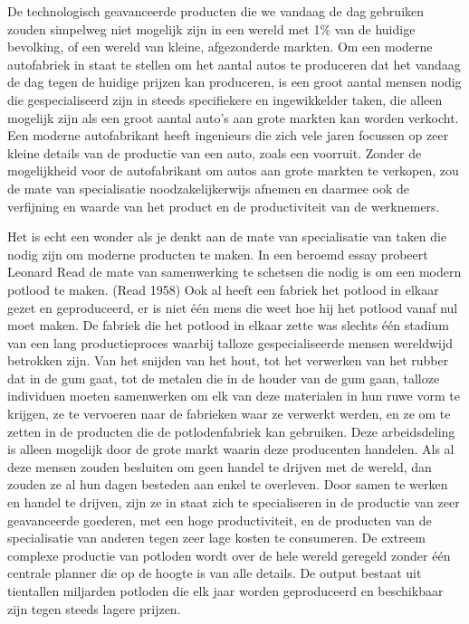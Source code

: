 \documentclass[
  a5paper,
  smalldemyvopaper,11pt,twoside,onecolumn,openright,extrafontsizes,
hidelinks]{memoir}
\begin{document}
De technologisch geavanceerde producten die we vandaag de dag gebruiken
zouden simpelweg niet mogelijk zijn in een wereld met 1\% van de huidige
bevolking, of een wereld van kleine, afgezonderde markten. Om een
moderne autofabriek in staat te stellen om het aantal autos te
produceren dat het vandaag de dag tegen de huidige prijzen kan
produceren, is een groot aantal mensen nodig die gespecialiseerd zijn in
steeds specifiekere en ingewikkelder taken, die alleen mogelijk zijn als
een groot aantal auto's aan grote markten kan worden verkocht. Een
moderne autofabrikant heeft ingenieurs die zich vele jaren focussen op
zeer kleine details van de productie van een auto, zoals een voorruit.
Zonder de mogelijkheid voor de autofabrikant om autos aan grote markten
te verkopen, zou de mate van specialisatie noodzakelijkerwijs afnemen en
daarmee ook de verfijning en waarde van het product en de productiviteit
van de werknemers.

Het is echt een wonder als je denkt aan de mate van specialisatie van
taken die nodig zijn om moderne producten te maken. In een beroemd essay
probeert Leonard Read de mate van samenwerking te schetsen die nodig is
om een modern potlood te maken. (Read 1958) Ook al heeft een fabriek het
potlood in elkaar gezet en geproduceerd, er is niet één mens die weet
hoe hij het potlood vanaf nul moet maken. De fabriek die het potlood in
elkaar zette was slechts één stadium van een lang productieproces
waarbij talloze gespecialiseerde mensen wereldwijd betrokken zijn. Van
het snijden van het hout, tot het verwerken van het rubber dat in de gum
gaat, tot de metalen die in de houder van de gum gaan, talloze
individuen moeten samenwerken om elk van deze materialen in hun ruwe
vorm te krijgen, ze te vervoeren naar de fabrieken waar ze verwerkt
werden, en ze om te zetten in de producten die de potlodenfabriek kan
gebruiken. Deze arbeidsdeling is alleen mogelijk door de grote markt
waarin deze producenten handelen. Als al deze mensen zouden besluiten om
geen handel te drijven met de wereld, dan zouden ze al hun dagen
besteden aan enkel te overleven. Door samen te werken en handel te
drijven, zijn ze in staat zich te specialiseren in de productie van zeer
geavanceerde goederen, met een hoge productiviteit, en de producten van
de specialisatie van anderen tegen zeer lage kosten te consumeren. De
extreem complexe productie van potloden wordt over de hele wereld
geregeld zonder één centrale planner die op de hoogte is van alle
details. De output bestaat uit tientallen miljarden potloden die elk
jaar worden geproduceerd en beschikbaar zijn tegen steeds lagere
prijzen.
\end{document}
